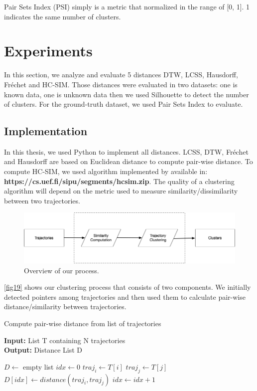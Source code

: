 \documentclass[a4paper, 12pt]{article}
\begin{document}
Pair Sets Index (PSI) simply is a metric that normalized in the range of [0, 1]. 1 indicates the same number of clusters.

\pagebreak

\section{Experiments}

In this section, we analyze and evaluate 5 distances DTW, LCSS, Hausdorff, Fréchet and HC-SIM. Those distances were evaluated in two datasets: one is known data, one is unknown data then we used Silhouette to detect the number of clusters. For the ground-truth dataset, we used Pair Sets Index to evaluate. 

\subsection{Implementation}

In this thesis, we used Python to implement all distances. LCSS, DTW, Fréchet and Hausdorff are based on Euclidean distance to compute pair-wise distance. To compute HC-SIM, we used algorithm implemented by \cite{franti2021averaging} available in: \textbf{https://cs.uef.fi/sipu/segments/hcsim.zip}. The quality of a clustering algorithm will depend on the metric used to measure similarity/dissimilarity between two trajectories.

\begin{figure}[htbp!]
    \centering
    \includegraphics[width=1\textwidth]{Process.png}
    \caption{Overview of our process.}
    \label{fig19}
\end{figure}

\autoref{fig19} shows our clustering process that consists of two components. We initially detected pointers among trajectories and then used them to calculate pair-wise distance/similarity between trajectories.

\begin{algorithm}
    \caption{Compute pair-wise distance from list of trajectories}\label{compute_distance_matrix}
    \textbf{Input:} List T containing N trajectories \\
    \textbf{Output:} Distance List D
    \begin{algorithmic}[1]
        \State $D \gets $ empty list
        \State $idx \gets 0$
            \State $traj_i \gets T[i]$
                \State $traj_j \gets T[j]$
                \State $D[idx] \gets distance(traj_i, traj_j)$
                \State $idx \gets idx + 1$
            \EndFor
        \EndFor
    \end{algorithmic}
\end{algorithm}
\end{document}
